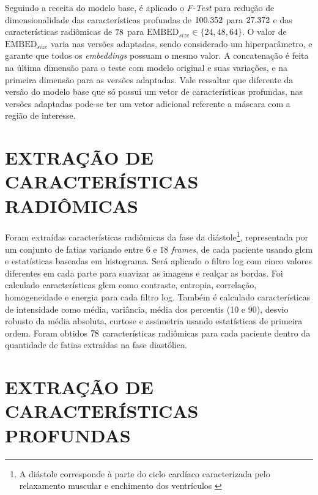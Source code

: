 Seguindo a receita do modelo base, é aplicado o \textit{F-Test} para redução de dimensionalidade das características profundas de $100.352$ para $27.372$ e das características radiômicas de $78$ para $\text{EMBED}_{size} \in \{24, 48, 64\}$. O valor de $\text{EMBED}_{size}$ varia nas versões adaptadas, sendo considerado um hiperparâmetro, e garante que todos os \textit{embeddings} possuam o mesmo valor. A concatenação é feita na última dimensão para o teste com modelo original e suas variações, e na primeira dimensão para as versões adaptadas. Vale ressaltar que diferente da versão do modelo base que só possui um vetor de características profundas, nas versões adaptadas pode-se ter um vetor adicional referente a máscara com a região de interesse. 

\section{EXTRAÇÃO DE CARACTERÍSTICAS RADIÔMICAS}
\label{subsec:cap4_caracteristicas_radiomicas}

Foram extraídas características radiômicas da fase da diástole\footnote{A diástole corresponde à parte do ciclo cardíaco caracterizada pelo relaxamento muscular e enchimento dos ventrículos \cite{brielerCardiomyopathyOverview2017}}, representada por um conjunto de fatias variando entre $6$ e $18$ \textit{frames}, de cada paciente usando \gls{glcm} e estatísticas baseadas em histograma. Será aplicado o filtro \gls{log} com cinco valores diferentes em cada parte para suavizar as imagens e realçar as bordas. Foi calculado características \gls{glcm} como contraste, entropia, correlação, homogeneidade e energia para cada filtro \gls{log}. Também é calculado características de intensidade como média, variância, média dos percentis (10 e 90), desvio robusto da média absoluta, curtose e assimetria usando estatísticas de primeira ordem. Foram obtidos $78$ características radiômicas para cada paciente dentro da quantidade de fatias extraídas na fase diastólica.

\section{EXTRAÇÃO DE CARACTERÍSTICAS PROFUNDAS}
\label{subsec:cap4_caracteristicas_profundas}
 
